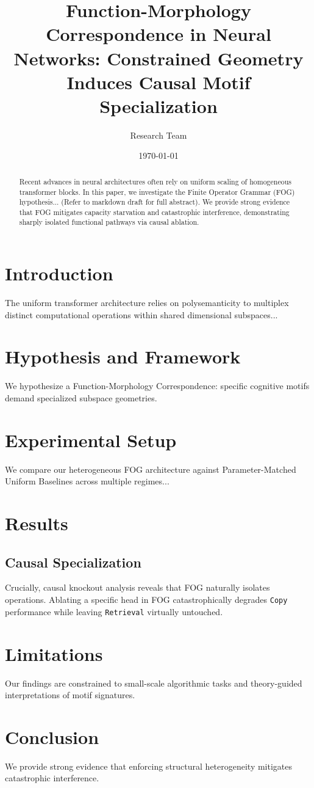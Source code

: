 \documentclass{article}
\title{Function-Morphology Correspondence in Neural Networks: Constrained Geometry Induces Causal Motif Specialization}
\author{Research Team}
\date{\today}
\begin{document}
\maketitle

\begin{abstract}
Recent advances in neural architectures often rely on uniform scaling of homogeneous transformer blocks. In this paper, we investigate the Finite Operator Grammar (FOG) hypothesis... (Refer to markdown draft for full abstract). We provide strong evidence that FOG mitigates capacity starvation and catastrophic interference, demonstrating sharply isolated functional pathways via causal ablation.
\end{abstract}

\section{Introduction}
The uniform transformer architecture relies on polysemanticity to multiplex distinct computational operations within shared dimensional subspaces...

\section{Hypothesis and Framework}
We hypothesize a Function-Morphology Correspondence: specific cognitive motifs demand specialized subspace geometries.

\section{Experimental Setup}
We compare our heterogeneous FOG architecture against Parameter-Matched Uniform Baselines across multiple regimes...

\section{Results}
\subsection{Causal Specialization}
Crucially, causal knockout analysis reveals that FOG naturally isolates operations. Ablating a specific head in FOG catastrophically degrades \texttt{Copy} performance while leaving \texttt{Retrieval} virtually untouched.

\section{Limitations}
Our findings are constrained to small-scale algorithmic tasks and theory-guided interpretations of motif signatures.

\section{Conclusion}
We provide strong evidence that enforcing structural heterogeneity mitigates catastrophic interference.
\end{document}
